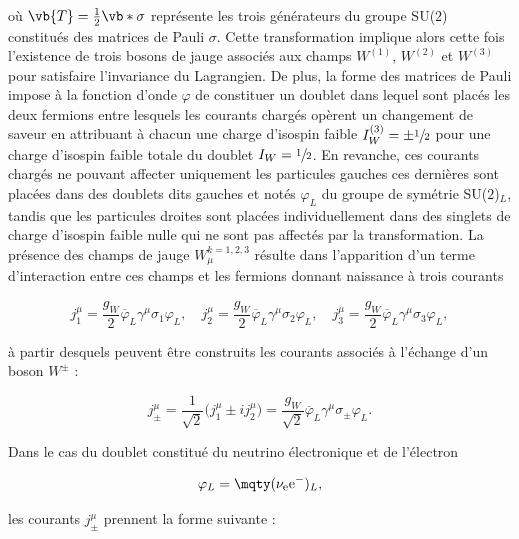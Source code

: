     où $\vb{T}=\frac{1}{2}\vb*{\sigma}$ représente les trois générateurs du groupe SU($2$) constitués des matrices de Pauli $\sigma$. Cette transformation implique alors cette fois l'existence de trois bosons de jauge associés aux champs $W^{(1)}$, $W^{(2)}$ et $W^{(3)}$ pour satisfaire l'invariance du Lagrangien. De plus, la forme des matrices de Pauli impose à la fonction d'onde $\varphi$ de constituer un doublet dans lequel sont placés les deux fermions entre lesquels les courants chargés opèrent un changement de saveur en attribuant à chacun une charge d'isospin faible $I_W^{(3)}=\pm\sfrac{1}{2}$ pour une charge d'isospin faible totale du doublet $I_W=\sfrac{1}{2}$. En revanche, ces courants chargés ne pouvant affecter uniquement les particules gauches ces dernières sont placées dans des doublets dits gauches et notés $\varphi_L$ du groupe de symétrie SU($2$)$_L$, tandis que les particules droites sont placées individuellement dans des singlets de charge d'isospin faible nulle qui ne sont pas affectés par la transformation. La présence des champs de jauge $W_\mu^{k=1,2,3}$ résulte dans l'apparition d'un terme d'interaction entre ces champs et les fermions donnant naissance à trois courants

    \begin{equation*}
        j_1^{\mu}=\frac{g_W}{2}\overline{\varphi}_L\gamma^{\mu}\sigma_1\varphi_L, \quad
        j_2^{\mu}=\frac{g_W}{2}\overline{\varphi}_L\gamma^{\mu}\sigma_2\varphi_L, \quad
        j_3^{\mu}=\frac{g_W}{2}\overline{\varphi}_L\gamma^{\mu}\sigma_3\varphi_L,
    \end{equation*}

    à partir desquels peuvent être construits les courants associés à l'échange d'un boson $W^{\pm}$ :

    \begin{equation}
    \boxed{
        j^{\mu}_{\pm}=\frac{1}{\sqrt{2}}\bigl(j_1^\mu\pm ij^\mu_2\bigr)=\frac{g_W}{\sqrt{2}}\overline{\varphi}_L\gamma^\mu \sigma_{\pm}\varphi_L.
    }
    \label{Wexchange}
    \end{equation}

    Dans le cas du doublet constitué du neutrino électronique et de l'électron 

    \begin{equation*}
        \varphi_L=\mqty(\nu_{\mbox{\footnotesize e}} \\ \mbox{e}^-)_L,
    \end{equation*}

    les courants $j^{\mu}_{\pm}$ prennent la forme suivante :

